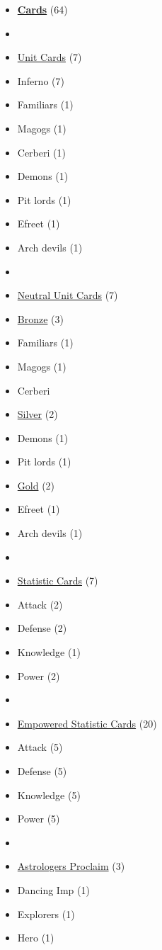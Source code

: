 \begin{multicols}{3}
\begin{itemize}[leftmargin=0pt, label={}, noitemsep, noitemsep]
  \item \textbf{\underline{Cards}} (64)
  \item
  \item \underline{Unit Cards} (7)
  \item Inferno (7)
  \item Familiars (1)
  \item Magogs (1)
  \item Cerberi (1)
  \item Demons (1)
  \item Pit lords (1)
  \item Efreet (1)
  \item Arch devils (1)
  \item
  \item \underline{Neutral Unit Cards} (7)
  \item \underline{Bronze} (3)
  \item Familiars (1)
  \item Magogs (1)
  \item Cerberi
  \item \underline{Silver} (2)
  \item Demons (1)
  \item Pit lords (1)
  \item \underline{Gold} (2)
  \item Efreet (1)
  \item Arch devils (1)
  \item
  \item \underline{Statistic Cards} (7)
  \item Attack (2)
  \item Defense (2)
  \item Knowledge (1)
  \item Power (2)
  \item
  \item \underline{Empowered Statistic Cards} (20)
  \item Attack (5)
  \item Defense (5)
  \item Knowledge (5)
  \item Power (5)
  \item
  \item \underline{Astrologers Proclaim} (3)
  \item Dancing Imp (1)
  \item Explorers (1)
  \item Hero (1)

\end{itemize}
\end{multicols}
